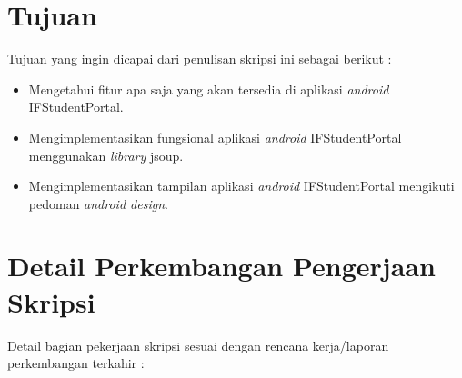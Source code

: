 \documentclass[a4paper,twoside]{article}
\begin{document}
\section{Tujuan}
Tujuan yang ingin dicapai dari penulisan skripsi ini sebagai berikut :
\begin{itemize}
    \item Mengetahui fitur apa saja yang akan tersedia di aplikasi \textit{android} IFStudentPortal.
    \item Mengimplementasikan fungsional aplikasi \textit{android} IFStudentPortal menggunakan \textit{library} jsoup.
    \item Mengimplementasikan tampilan aplikasi \textit{android} IFStudentPortal mengikuti pedoman \textit{android design}.
\end{itemize}

\section{Detail Perkembangan Pengerjaan Skripsi}
Detail bagian pekerjaan skripsi sesuai dengan rencana kerja/laporan perkembangan terkahir :
\end{document}
